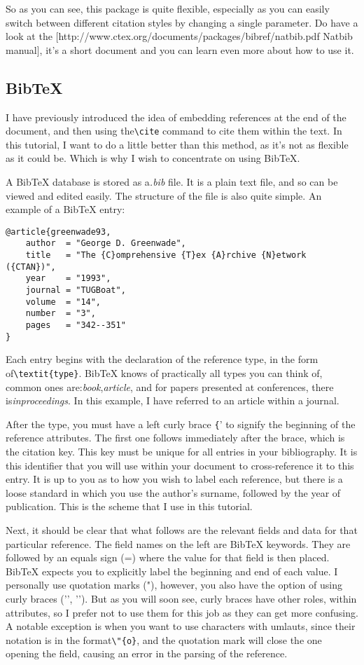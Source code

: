 So as you can see, this package is quite flexible, especially as you can easily
switch between different citation styles by changing a single parameter. Do
have a look at the [http://www.ctex.org/documents/packages/bibref/natbib.pdf
Natbib manual], it's a short document and you can learn even more about how to
use it.

\subsection{BibTeX}
I have previously introduced the idea of embedding references at the end of the
document, and then using the\verb|\cite| command to cite them within the text.
In this tutorial, I want to do a little better than this method, as it's not as
flexible as it could be. Which is why I wish to concentrate on
using BibTeX.

A BibTeX database is stored as a\textit{.bib} file. It is a plain text file,
and so can be viewed and edited easily. The structure of the file is also quite
simple. An example of a BibTeX entry:

\begin{lstlisting}
@article{greenwade93,
    author  = "George D. Greenwade",
    title   = "The {C}omprehensive {T}ex {A}rchive {N}etwork ({CTAN})",
    year    = "1993",
    journal = "TUGBoat",
    volume  = "14",
    number  = "3",
    pages   = "342--351"
}
\end{lstlisting}
Each entry begins with the declaration of the reference type, in the form
of\verb|\textit{type}|. BibTeX knows of practically all types you can think of,
common ones are:\textit{book},\textit{article}, and for papers presented at
conferences, there is\textit{inproceedings}. In this example, I have referred
to an article within a journal.

After the type, you must have a left curly brace \verb|{|' to signify the
beginning of the reference attributes. The first one follows immediately after
the brace, which is the citation key. This key must be unique for all entries
in your bibliography. It is this identifier that you will use within your
document to cross-reference it to this entry. It is up to you as to how you
wish to label each reference, but there is a loose standard in which you use
the author's surname, followed by the year of publication. This is the scheme
that I use in this tutorial.

Next, it should be clear that what follows are the relevant fields and data for
that particular reference. The field names on the left are BibTeX keywords.
They are followed by an equals sign (=) where the value for that field is then
placed.  BibTeX expects you to explicitly label the beginning and end of each
value. I personally use quotation marks ("), however, you also have the option
of using curly braces ('{', '}'). But as you will soon see, curly braces have
other roles, within attributes, so I prefer not to use them for this job as
they can get more confusing. A notable exception is when you want to use
characters with
umlauts, since their notation is in the format\verb|\"{o}|, and the quotation
mark will close the one opening the field, causing an error in the parsing of
the reference.

